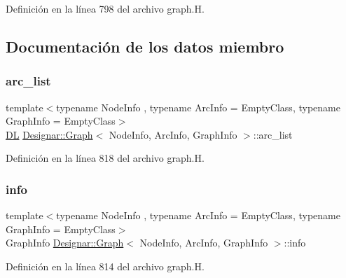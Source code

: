 Definición en la línea 798 del archivo graph.\+H.



\subsection{Documentación de los datos miembro}
\mbox{\label{class_designar_1_1_graph_a8c809db7848c78f6718aad466ee959b2}} 
\subsubsection{\texorpdfstring{arc\+\_\+list}{arc\_list}}
{\footnotesize\ttfamily template$<$typename Node\+Info , typename Arc\+Info  = Empty\+Class, typename Graph\+Info  = Empty\+Class$>$ \\
\hyperlink{class_designar_1_1_d_l}{DL} \hyperlink{class_designar_1_1_graph}{Designar\+::\+Graph}$<$ Node\+Info, Arc\+Info, Graph\+Info $>$\+::arc\+\_\+list\hspace{0.3cm}{\ttfamily [protected]}}



Definición en la línea 818 del archivo graph.\+H.

\mbox{\label{class_designar_1_1_graph_a2a8b41ce641ad2fb1b84a4d6b024bb1a}} 
\subsubsection{\texorpdfstring{info}{info}}
{\footnotesize\ttfamily template$<$typename Node\+Info , typename Arc\+Info  = Empty\+Class, typename Graph\+Info  = Empty\+Class$>$ \\
Graph\+Info \hyperlink{class_designar_1_1_graph}{Designar\+::\+Graph}$<$ Node\+Info, Arc\+Info, Graph\+Info $>$\+::info\hspace{0.3cm}{\ttfamily [protected]}}



Definición en la línea 814 del archivo graph.\+H.

\mbox{\label{class_designar_1_1_graph_a31b0117b6d87816f703a4a5baa1fa6ce}} 
